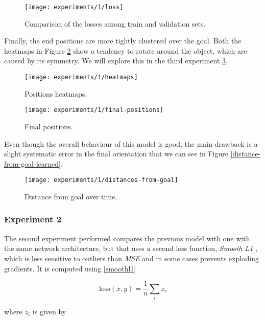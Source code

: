 \begin{figure}[htbp]
	
\centerline{\texttt{[image: experiments/1/loss]}}
	\caption{Comparison of the losses among train and validation sets.}
	\label{fig:loss}
\end{figure}

Finally, the end positions are more tightly clustered over the goal.
Both the heatmaps in Figure \ref{fig:heatmaps} show a tendency to rotate around 
the object, which are caused by its symmetry. We will explore this in the third 
experiment \ref{fig:final-positions}.

\begin{figure}[htbp]
	\centerline{\texttt{[image: experiments/1/heatmaps]}}
	\caption{Positions heatmaps.}
	\label{fig:heatmaps}
\end{figure}

\begin{figure}[htbp]
	\centerline{\texttt{[image: experiments/1/final-positions]}}
	\caption{Final positions.}
	\label{fig:final-positions}
\end{figure}


Even though the overall behaviour of this model is good, the main drawback is a 
slight systematic error in the final orientation that we can see in Figure 
\ref{distance-from-goal-learned}.

\begin{figure}[htbp]
	\centerline{\texttt{[image: experiments/1/distances-from-goal]}}
	\caption{Distance from goal over time.}
	\label{fig:distance-from-goal-learned}
\end{figure}

\subsubsection{Experiment 2}
The second experiment performed compares the previous model with one with the 
same network architecture, but that uses a second loss function, \emph{Smooth 
L1} \cite{smoothl1}, which is less sensitive to outliers than \emph{MSE} and in 
some cases prevents exploding gradients. It is computed using \eqref{smoothl1}

\begin{equation}
\text{loss}(x, y) = \frac{1}{n}\sum_{i}z_i
\label{smoothl1}
\end{equation}

where $z_i$ is given by

